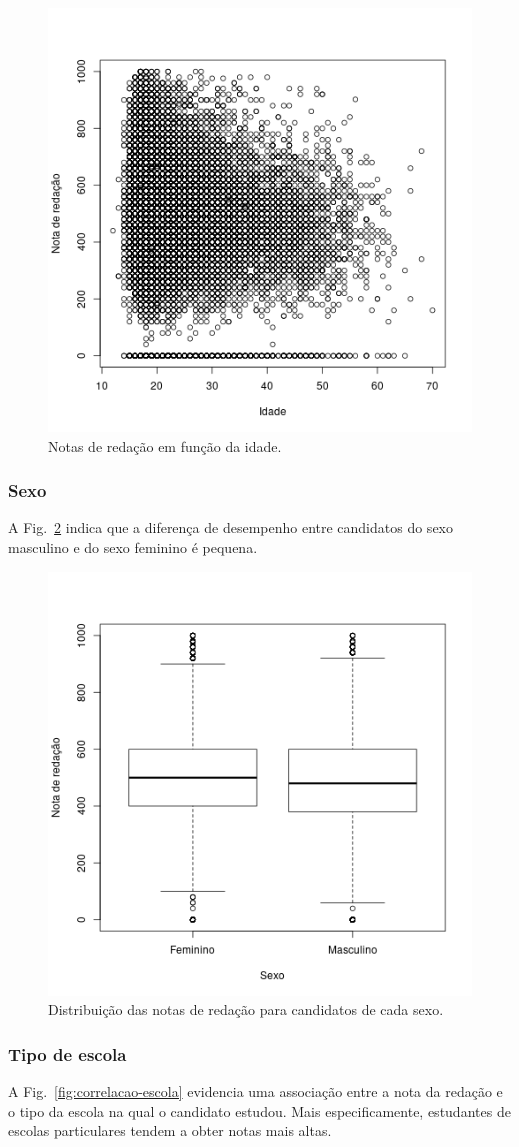 \documentclass[12pt]{article}
\newcommand{\reffig}[1]{Fig.~\ref{fig:#1}}
\begin{document}
\begin{figure}[H]
\centering\includegraphics[width=.5\linewidth]{../correlacao_idade.png}
\caption{Notas de redação em função da idade.}
\label{fig:correlacao-idade}
\end{figure}

\subsubsection{Sexo}
A \reffig{correlacao-sexo} indica que a diferença de desempenho entre candidatos do sexo masculino e do sexo feminino é pequena.

\begin{figure}[H]
\centering\includegraphics[width=.5\linewidth]{../correlacao_sexo.png}
\caption{Distribuição das notas de redação para candidatos de cada sexo.}
\label{fig:correlacao-sexo}
\end{figure}

\subsubsection{Tipo de escola}
A \reffig{correlacao-escola} evidencia uma associação entre a nota da redação e o tipo da escola na qual o candidato estudou.
Mais especificamente, estudantes de escolas particulares tendem a obter notas mais altas.
\end{document}
